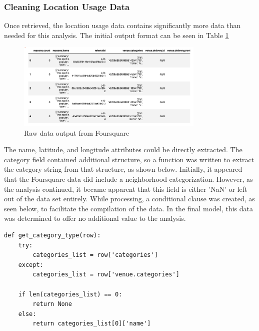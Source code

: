 \documentclass[11pt]{amsart}
\begin{document}
\subsubsection{Cleaning Location Usage Data}
Once retrieved, the location usage data contains significantly more data than needed for this analysis. The initial output format can be seen in Table \ref{tab:fsraw}

\begin{figure}
\includegraphics[width=0.8\textwidth]{Foursquare_API_output_table_raw}
\caption{Raw data output from Foursquare}
\label{tab:fsraw}
\end{figure}

The name, latitude, and longitude attributes could be directly extracted. The category field contained additional structure, so a function was written to extract the category string from that structure, as shown below. 
Initially, it appeared that the Foursquare data did include a neighborhood categorization. However, as the analysis continued, it became apparent that this field is either 'NaN' or left out of the data set entirely. While processing, a conditional clause was created, as seen below, to facilitate the compilation of the data.  In the final model, this data was determined to offer no additional value to the analysis. 

\lstset{language=Python}
\begin{lstlisting}[caption={Category Extraction Function}]
def get_category_type(row):
    try:
        categories_list = row['categories']
    except:
        categories_list = row['venue.categories']
        
    if len(categories_list) == 0:
        return None
    else:
        return categories_list[0]['name']
\end{lstlisting}
\end{document}
